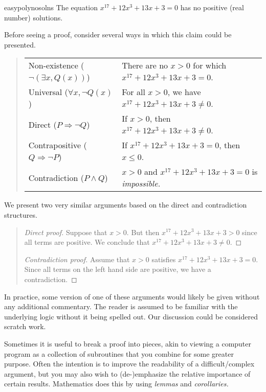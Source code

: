 \begin{example}{}{easypolynosolns}
	The equation $x^{17}+12x^3+13x+3=0$ has no positive (real number) solutions.\medbreak

	Before seeing a proof, consider several ways in which this claim could be presented.
	\begin{quote}
		\def\arraystretch{1.1}
		\begin{tabular}{@{}ll}
			Non-existence ($\neg(\exists x, Q(x))$)& There are no $x>0$ for which $x^{17}+12x^3+13x+3=0$.\\
			Universal ($\forall x,\neg Q(x)$)&For all $x>0$, we have $x^{17}+12x^3+13x+3\neq 0$.\\
			Direct ($P\Rightarrow \neg Q$)&If $x>0$, then $x^{17}+12x^3+13x+3\neq 0$.\\
			Contrapositive ($Q\Rightarrow\neg P$)&If $x^{17}+12x^3+13x+3=0$, then $x\le 0$.\\
			Contradiction ($P\wedge Q$)&$x>0$ and $x^{17}+12x^3+13x+3=0$ is \emph{impossible.}
		\end{tabular}
	\end{quote}
	
	We present two very similar arguments based on the direct and contradiction structures.  
	
	\begin{quote}
		\begin{proof}[Direct proof]
		Suppose that $x>0$. But then $x^{17}+12x^3+13x+3>0$ since all terms are positive. We conclude that $x^{17}+12x^3+13x+3\neq 0$.
		\end{proof}
		\begin{proof}[Contradiction proof]
		Assume that $x>0$ satisfies $x^{17}+12x^3+13x+3=0$. Since all terms on the left hand side are positive, we have a contradiction.
		\end{proof}
	\end{quote}
	
	In practice, some version of one of these arguments would likely be given without any additional commentary. The reader is assumed to be familiar with the underlying logic without it being spelled out. Our discussion could be considered scratch work.
\end{example}


Sometimes it is useful to break a proof into pieces, akin to viewing a computer program as a collection of subroutines that you combine for some greater purpose. Often the intention is to improve the readability of a difficult/complex argument, but you may also wish to (de-)emphasize the relative importance of certain results. Mathematics does this by using \emph{lemmas} and \emph{corollaries.}

